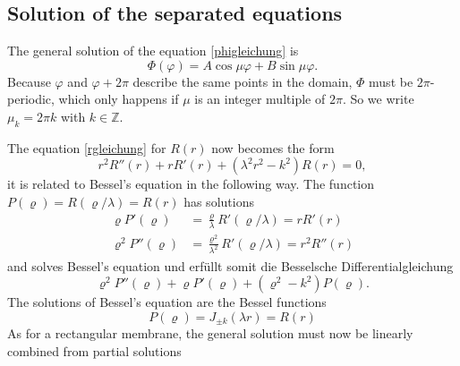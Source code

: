 \subsection{Solution of the separated equations}
The general solution of the equation \eqref{phigleichung} is
\[
\Phi(\varphi)=A\cos\mu\varphi +B\sin\mu\varphi.
\]
Because $\varphi$ and $\varphi+2\pi$ describe the same points in the domain,
$\Phi$ must be $2\pi$-periodic, which only happens if
$\mu$ is an integer multiple of $2\pi$.
So we write $\mu_k = 2\pi k$ with $k\in\mathbb Z$.

The equation \eqref{rgleichung} for $R(r)$ now becomes the form
\[
r^2R''(r)+rR'(r)+(\lambda^2 r^2-k^2)R(r)=0,
\]
it is related to Bessel's equation in the following way.
The function
$P(\varrho)=R(\varrho/\lambda)=R(r)$ has solutions
\begin{align*}
\varrho P'(\varrho)&=\frac{\varrho}{\lambda}R'(\varrho/\lambda)=rR'(r)\\
\varrho^2 P''(\varrho)&=\frac{\varrho^2}{\lambda^2}R'(\varrho/\lambda)=r^2R''(r)
\end{align*}
and solves Bessel's equation
und erfüllt somit die Besselsche Differentialgleichung
\[
\varrho^2P''(\varrho)+\varrho P'(\varrho)+(\varrho^2-k^2)P(\varrho).
\]
The solutions of Bessel's equation are the Bessel functions
\[
P(\varrho)=J_{\pm k}(\lambda r)=R(r)
\]
As for a rectangular membrane, the general solution must now be
linearly combined from partial solutions

